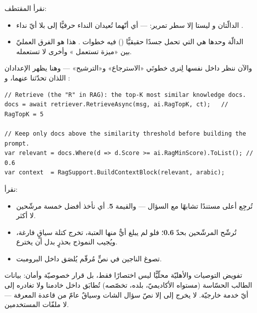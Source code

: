 نقرأ المقتطف:
\begin{itemize}
  \item الدالّتان  و 
    ليستا إلا سطر تمرير:  — أي أنّهما تُعيدان النداء حرفيًّا إلى
     بلا أيّ نداء .
  \item الدالّة  وحدها هي التي تحمل جسدًا حقيقيًّا ()
    فيه خطوات . هذا هو الفرق العمليّ بين «ميزة تستعمل » وأخرى لا تستعمله.
\end{itemize}

والآن ننظر داخل  نفسها لِنرى خطوتَي «الاسترجاع» و«الترشيح» — وهنا
يظهر الإعدادان اللذان تحدّثنا عنهما،  و :

\begin{english}
\begin{lstlisting}[language={[Sharp]C}]
// Retrieve (the "R" in RAG): the top-K most similar knowledge docs.
docs = await retriever.RetrieveAsync(msg, ai.RagTopK, ct);   // RagTopK = 5

// Keep only docs above the similarity threshold before building the prompt.
var relevant = docs.Where(d => d.Score >= ai.RagMinScore).ToList(); // 0.6
var context  = RagSupport.BuildContextBlock(relevant, arabic);
\end{lstlisting}
\end{english}

نقرأ:
\begin{itemize}
  \item {} تُرجِع أعلى  مستندًا
    تشابهًا مع السؤال — والقيمة \textbf{5}. أي نأخذ أفضل خمسة مرشّحين لا أكثر.
  \item {} تُرشّح المرشّحين بحدّ \textbf{0.6}؛
    فلو لم يبلغ أيٌّ منها العتبة، تخرج كتلة سياقٍ فارغة، ويُجيب النموذج بحذرٍ بدل أن
    يخترع.
  \item {} تصوغ الناجين في نصٍّ مُرقّم يُلصَق داخل البرومبت.
\end{itemize}

\begin{secnote}
تفويض التوصيات والأهليّة محلّيًّا ليس اختصارًا فقط، بل قرار خصوصيّة وأمان: بيانات
الطالب الحسّاسة (مستواه الأكاديميّ، بلده، تخصّصه) تُطابَق داخل خادمنا ولا تغادره إلى
أيّ خدمة خارجيّة. لا يخرج إلى  إلا نصّ سؤال الشات وسياقٌ عامّ من قاعدة
المعرفة — لا ملفّات المستخدمين.
\end{secnote}


